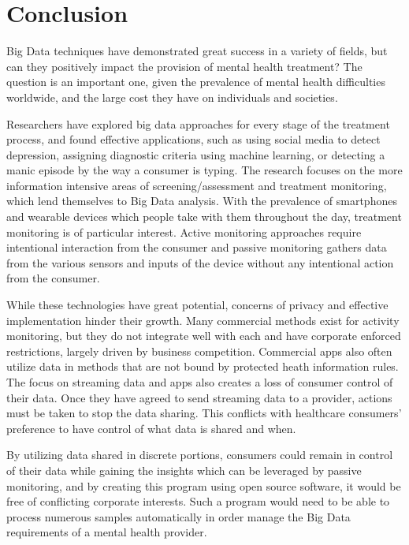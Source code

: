 \documentclass[sigconf]{acmart}
\begin{document}
\section{Conclusion}

Big Data techniques have demonstrated great success in a variety of fields, but can they positively impact the provision of mental health treatment? The question is an important one, given the prevalence of mental health difficulties worldwide, and the large cost they have on individuals and societies. 

Researchers have explored big data approaches for every stage of the treatment process, and found effective applications, such as using social media to detect depression, assigning diagnostic criteria using machine learning, or detecting a manic episode by the way a consumer is typing. The research focuses on the more information intensive areas of screening/assessment and treatment monitoring, which lend themselves to Big Data analysis. With the prevalence of smartphones and wearable devices which people take with them throughout the day, treatment monitoring is of particular interest. Active monitoring approaches require intentional interaction from the consumer and passive monitoring gathers data from the various sensors and inputs of the device without any intentional action from the consumer. 

While these technologies have great potential, concerns of privacy and effective implementation hinder their growth. Many commercial methods exist for activity monitoring, but they do not integrate well with each and have corporate enforced restrictions, largely driven by business competition. Commercial apps also often utilize data in methods that are not bound by protected heath information rules. The focus on streaming data and apps also creates a loss of consumer control of their data. Once they have agreed to send streaming data to a provider, actions must be taken to stop the data sharing. This conflicts with healthcare consumers' preference to have control of what data is shared and when. 

By utilizing data shared in discrete portions, consumers could remain in control of their data while gaining the insights which can be leveraged by passive monitoring, and by creating this program using open source software, it would be free of conflicting corporate interests. Such a program would need to be able to process numerous samples automatically in order manage the Big Data requirements of a mental health provider.
\end{document}
